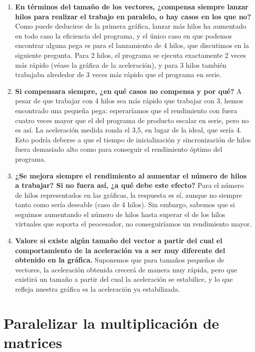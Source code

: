 \documentclass{report}
\newcommand\tab[1][0.6cm]{\hspace*{#1}}
\newcommand\nl{\newline\tab}
\begin{document}
\begin{enumerate}
		\item{\textbf{\tab En	términos	del	tamaño	de	los	vectores,	¿compensa	siempre	lanzar	hilos	para	realizar	el	trabajo	en	
				paralelo,	o	hay	casos	en	los	que	no?	 }\nl
			Como puede deducirse de la primera gráfica, lanzar más hilos ha aumentado en todo caso la eficiencia del programa, y el único caso en que podemos encontrar alguna pega es para el lanzamiento de 4 hilos, que discutimos en la siguiente pregunta. 
			\nl Para 2 hilos, el programa se ejecuta exactamente 2 veces más rápido (véase la gráfica de la aceleración), y para 3 hilos también trabajaba alrededor de 3 veces más rápido que el programa en serie.
		}
		\item{\textbf{\tab Si	compensara	siempre,	¿en	qué	casos	no	compensa	y	por	qué?	}\nl
			A pesar de que trabajar con 4 hilos sea más rápido que trabajar con 3, hemos encontrado una pequeña pega: esperaríamos que el rendimiento con fuera cuatro veces mayor que el del programa de producto escalar en serie, pero no es así. La aceleración medida ronda el 3,5, en lugar de la ideal, que sería 4.
			\nl Esto podría deberse a que el tiempo de inicialización y sincronización de hilos fuera demasiado alto como para conseguir el rendimiento óptimo del programa.
		}
		\item{\textbf{\tab ¿Se	mejora	siempre	el	rendimiento	al	aumentar	el	número	de	hilos	a	trabajar?	Si	no	fuera	así,	¿a	qué	debe	este	efecto?
			}\nl
			Para el número de hilos representados en las gráficas, la respuesta es sí, aunque no siempre tanto como sería deseable (caso de 4 hilos). Sin embargo, sabemos que si seguimos aumentando el número de hilos hasta superar el de los hilos virtuales que soporta el peocesador, no conseguiríamos un rendimiento mayor.
		}
		\item{\textbf{\tab Valore	si	existe	algún	tamaño	del	vector	a	partir	del	cual	el	comportamiento	de	la	aceleración	va	a	
				ser	muy	diferente	del	obtenido	en	la	gráfica.	}\nl
			Suponemos que para  tamaños pequeños de vectores, la aceleración obtenida crecerá de manera muy rápida, pero que existirá un tamaño a partir del cual la aceleración se estabilice, y lo que refleja nuestra gráfica es la aceleración ya estabilizada.
		}
	\end{enumerate}
	\newpage
	
	
	\section {Paralelizar la multiplicación de matrices}
	
\end{document}

